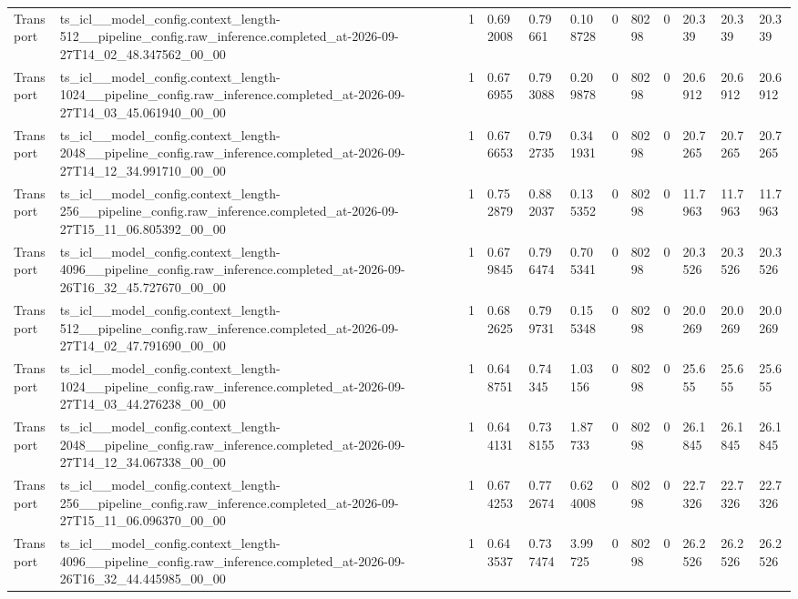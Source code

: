 \begin{tabular}{llllllllllll}
Transport & ts\_icl\_\_model\_config.context\_length-512\_\_pipeline\_config.raw\_inference.completed\_at-2026-09-27T14\_02\_48.347562\_00\_00 & 1 & 0.692008 & 0.79661 & 0.108728 & 0 & 80298 & 0 & 20.339 & 20.339 & 20.339 \\
Transport & ts\_icl\_\_model\_config.context\_length-1024\_\_pipeline\_config.raw\_inference.completed\_at-2026-09-27T14\_03\_45.061940\_00\_00 & 1 & 0.676955 & 0.793088 & 0.209878 & 0 & 80298 & 0 & 20.6912 & 20.6912 & 20.6912 \\
Transport & ts\_icl\_\_model\_config.context\_length-2048\_\_pipeline\_config.raw\_inference.completed\_at-2026-09-27T14\_12\_34.991710\_00\_00 & 1 & 0.676653 & 0.792735 & 0.341931 & 0 & 80298 & 0 & 20.7265 & 20.7265 & 20.7265 \\
Transport & ts\_icl\_\_model\_config.context\_length-256\_\_pipeline\_config.raw\_inference.completed\_at-2026-09-27T15\_11\_06.805392\_00\_00 & 1 & 0.752879 & 0.882037 & 0.135352 & 0 & 80298 & 0 & 11.7963 & 11.7963 & 11.7963 \\
Transport & ts\_icl\_\_model\_config.context\_length-4096\_\_pipeline\_config.raw\_inference.completed\_at-2026-09-26T16\_32\_45.727670\_00\_00 & 1 & 0.679845 & 0.796474 & 0.705341 & 0 & 80298 & 0 & 20.3526 & 20.3526 & 20.3526 \\
Transport & ts\_icl\_\_model\_config.context\_length-512\_\_pipeline\_config.raw\_inference.completed\_at-2026-09-27T14\_02\_47.791690\_00\_00 & 1 & 0.682625 & 0.799731 & 0.155348 & 0 & 80298 & 0 & 20.0269 & 20.0269 & 20.0269 \\
Transport & ts\_icl\_\_model\_config.context\_length-1024\_\_pipeline\_config.raw\_inference.completed\_at-2026-09-27T14\_03\_44.276238\_00\_00 & 1 & 0.648751 & 0.74345 & 1.03156 & 0 & 80298 & 0 & 25.655 & 25.655 & 25.655 \\
Transport & ts\_icl\_\_model\_config.context\_length-2048\_\_pipeline\_config.raw\_inference.completed\_at-2026-09-27T14\_12\_34.067338\_00\_00 & 1 & 0.644131 & 0.738155 & 1.87733 & 0 & 80298 & 0 & 26.1845 & 26.1845 & 26.1845 \\
Transport & ts\_icl\_\_model\_config.context\_length-256\_\_pipeline\_config.raw\_inference.completed\_at-2026-09-27T15\_11\_06.096370\_00\_00 & 1 & 0.674253 & 0.772674 & 0.624008 & 0 & 80298 & 0 & 22.7326 & 22.7326 & 22.7326 \\
Transport & ts\_icl\_\_model\_config.context\_length-4096\_\_pipeline\_config.raw\_inference.completed\_at-2026-09-26T16\_32\_44.445985\_00\_00 & 1 & 0.643537 & 0.737474 & 3.99725 & 0 & 80298 & 0 & 26.2526 & 26.2526 & 26.2526 \\

\end{tabular}
